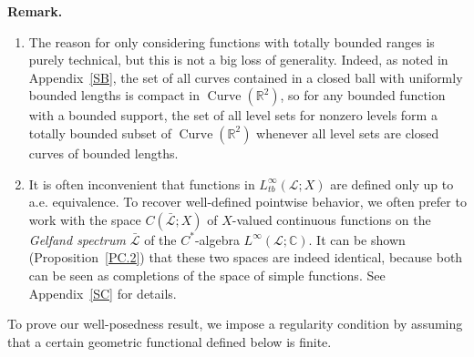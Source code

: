 \documentclass[reqno,centertags,12pt]{amsart}
\theoremstyle{definition}
\numberwithin{equation}{section}
\newcommand{\bbR}{{\mathbb{R}}}
\newcommand{\bbC}{{\mathbb{C}}}
\begin{document}
\textbf{Remark.}
\begin{enumerate}
    \item The reason for only considering functions with totally bounded ranges is
    purely technical, but this is not a big loss of generality.
    Indeed, as noted in Appendix~\ref{SB},
    the set of all curves contained in a closed ball with uniformly bounded lengths is compact
    in $\operatorname{Curve}(\bbR^{2})$, so for any bounded function with a bounded support,
    the set of all level sets for nonzero levels form a totally bounded subset of
    $\operatorname{Curve}(\bbR^{2})$ whenever all level sets are closed curves of
    bounded lengths.

    \item It is often inconvenient that functions in $L_{tb}^{\infty}(\mathcal{L};X)$
    are defined only up to a.e. equivalence. To recover well-defined pointwise behavior,
    we often prefer to work with the space $C(\bar{\mathcal{L}};X)$ of $X$-valued
    continuous functions on the \emph{Gelfand spectrum} $\bar{\mathcal{L}}$ of the
    $C^{*}$-algebra $L^{\infty}(\mathcal{L};\bbC)$. It can be shown
    (Proposition~\ref{PC.2}) that
    these two spaces are indeed identical, because both can be seen as
    completions of the space of simple functions.
    See Appendix~\ref{SC} for details.
\end{enumerate}

To prove our well-posedness result, we impose a regularity condition by assuming that
a certain geometric functional defined below is finite.
\end{document}
